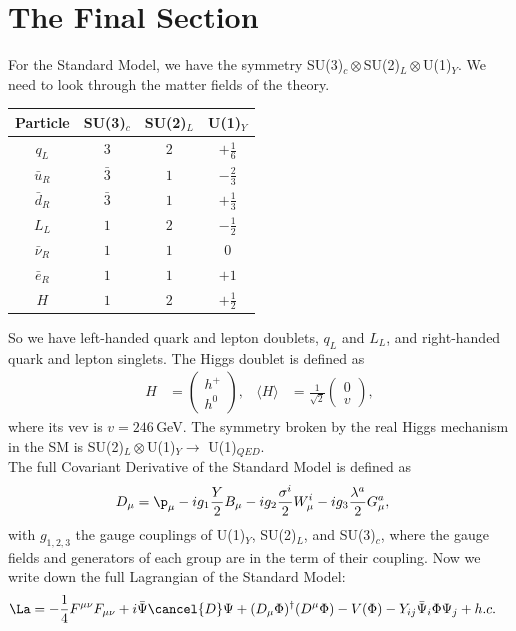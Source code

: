 \documentclass[a4paper, 11pt, normalem]{report}
\begin{document}
\section{The Final Section}
For the Standard Model, we have the symmetry SU(3)$_c\otimes$SU(2)$_L\otimes$U(1)$_Y$.
We need to look through the matter fields of the theory.
\begin{table}[H]
    \centering
    \begin{tabular}{c|ccc}
        \hline\hline
        \bfseries Particle &\bfseries SU(3)$_c$ &\bfseries SU(2)$_L$ &\bfseries U(1)$_Y$ \\
        \hline\hline
        $q_L$ & $3$ & $2$ & $+\frac16$ \\
        $\bar{u}_R$ & $\bar{3}$ & $1$ & $-\frac23$ \\
        $\bar{d}_R$ & $\bar{3}$ & $1$ & $+\frac13$ \\
        $L_L$ & $1$ & $2$ & $-\frac12$ \\
        $\bar{\nu}_R$ & $1$ & $1$ & $0$ \\
        $\bar{e}_R$ & $1$ & $1$ & $+1$ \\
        \hline
        $H$ & $1$ & $2$ & $+\frac12$ \\
        \hline\hline
    \end{tabular}
\end{table}
So we have left-handed quark and lepton doublets, $q_L$ and $L_L$, and right-handed quark and lepton singlets.
The Higgs doublet is defined as
\begin{align}
    H &= \begin{pmatrix} h^+ \\ h^0\end{pmatrix}, & \langle H\rangle &= \frac{1}{\sqrt{2}}\begin{pmatrix} 0 \\ v\end{pmatrix},
\end{align}
where its vev is $v=246\,$GeV.
The symmetry broken by the real Higgs mechanism in the SM is SU(2)$_L\otimes$U(1)$_Y\to$ U(1)$_{QED}$.\\
The full Covariant Derivative of the Standard Model is defined as
\begin{align}
    D_\mu &= \p_\mu - ig_1\frac{Y}{2}B_\mu - ig_2\frac{\sigma^i}{2}W^i_\mu - ig_3\frac{\lambda^a}{2}G_\mu^a,
\end{align}
with $g_{1,2,3}$ the gauge couplings of U(1)$_Y$, SU(2)$_L$, and SU(3)$_c$, where the gauge fields and generators of each group are in the term of their coupling.
Now we write down the full Lagrangian of the Standard Model:
\begin{align}
    \La &= -\frac14F^{\mu\nu}F_{\mu\nu} + i\bar{\Psi}\cancel{D}\Psi + (D_\mu\Phi)^\dagger(D^\mu\Phi) - V(\Phi) - Y_{ij}\bar{\Psi}_i\Phi\Psi_j + h.c.
\end{align}
\end{document}
